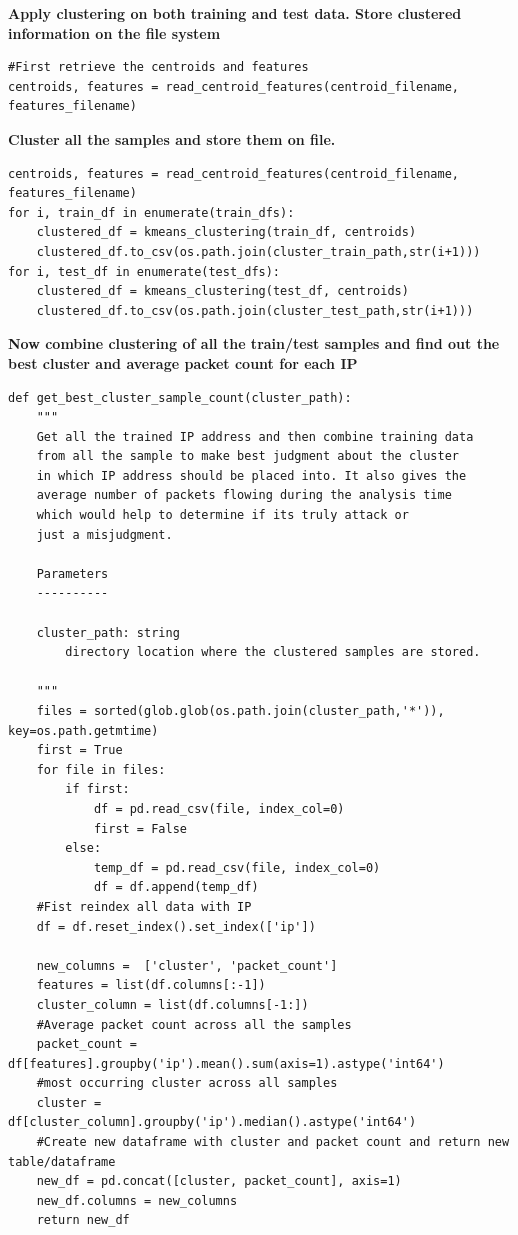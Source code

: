 \documentclass{article}
\begin{document}
\textbf{\large{Apply clustering on both training and test data. Store clustered information on the file system}}
\begin{verbatim}
#First retrieve the centroids and features
centroids, features = read_centroid_features(centroid_filename, features_filename)
\end{verbatim}
\textbf{Cluster all the samples and store them on file.}
\begin{verbatim}
centroids, features = read_centroid_features(centroid_filename, features_filename)
for i, train_df in enumerate(train_dfs):
    clustered_df = kmeans_clustering(train_df, centroids)
    clustered_df.to_csv(os.path.join(cluster_train_path,str(i+1)))
for i, test_df in enumerate(test_dfs):
    clustered_df = kmeans_clustering(test_df, centroids)
    clustered_df.to_csv(os.path.join(cluster_test_path,str(i+1)))
\end{verbatim}
\textbf{\large{Now combine clustering of all the train/test samples and find out the best cluster and average packet count for each IP}}
\begin{verbatim}
def get_best_cluster_sample_count(cluster_path):
    """
    Get all the trained IP address and then combine training data
    from all the sample to make best judgment about the cluster
    in which IP address should be placed into. It also gives the
    average number of packets flowing during the analysis time
    which would help to determine if its truly attack or
    just a misjudgment.

    Parameters
    ----------

    cluster_path: string
        directory location where the clustered samples are stored.

    """
    files = sorted(glob.glob(os.path.join(cluster_path,'*')),  key=os.path.getmtime)
    first = True
    for file in files:
        if first:
            df = pd.read_csv(file, index_col=0)
            first = False
        else:
            temp_df = pd.read_csv(file, index_col=0)
            df = df.append(temp_df)
    #Fist reindex all data with IP
    df = df.reset_index().set_index(['ip'])

    new_columns =  ['cluster', 'packet_count']
    features = list(df.columns[:-1])
    cluster_column = list(df.columns[-1:])
    #Average packet count across all the samples
    packet_count = df[features].groupby('ip').mean().sum(axis=1).astype('int64')
    #most occurring cluster across all samples
    cluster = df[cluster_column].groupby('ip').median().astype('int64')
    #Create new dataframe with cluster and packet count and return new table/dataframe
    new_df = pd.concat([cluster, packet_count], axis=1)
    new_df.columns = new_columns
    return new_df
\end{verbatim}
\end{document}
